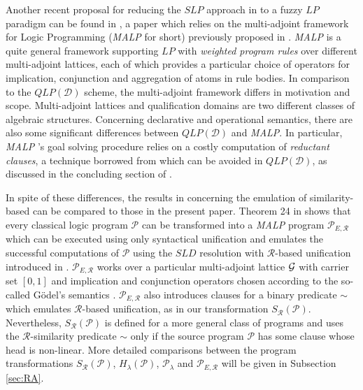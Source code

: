 \documentclass{sigplanconf}
\newcommand{\qdom}{\mathcal{D}} \newcommand{\dqdom}{D \setminus \{\bot\}} \newcommand{\bqdom}{(D \setminus \{\bot\}) \uplus \{?\}}
\newcommand{\simrel}{\mathcal{R}}
\newcommand{\qlp}[1]{QLP({#1})} \newcommand{\slp}[2]{SLP({#1,#2})} \newcommand{\sqlp}[2]{SQLP({#1,#2})} \newcommand{\bqlp}[1]{BQLP({#1})} \newcommand{\clp}[1]{CLP({#1})}
\newcommand{\trans}[2]{S_{#1}(#2)}
\newcommand{\extended}[2]{H_{#1}(#2)} \newcommand{\abstracted}[2]{{#1}_{#2}}
\newcommand{\MAProg}{\mathcal{P}_{E, \simrel}}
\newcommand{\Prog}{\mathcal{P}} \newcommand{\UProg}{\mathcal{P_U}}
\newcommand{\MALP}{{\em MALP }}
\newcommand{\malp}{{\em MALP}}
\theoremstyle{definition}
\theoremstyle{plain}
\begin{document}
Another recent proposal for reducing the $SLP$ approach in \cite{Ses02} to a fuzzy $LP$ paradigm can be found in \cite{MOV04}, a  paper which relies on  the multi-adjoint framework for Logic Programming ({\MALP} for short) previously proposed in \cite{MOV01a,MOV01b}. {\MALP} is a quite general framework supporting $LP$ with {\em weighted program rules} over different multi-adjoint lattices, each of which provides a particular choice of operators for implication, conjunction  and aggregation of atoms in rule bodies. In comparison to the $\qlp{\qdom}$ scheme, the multi-adjoint framework differs in motivation and scope. Multi-adjoint lattices and qualification domains are  two different classes of algebraic structures. Concerning declarative and
operational semantics, there are also some significant differences between $\qlp{\qdom}$ and \malp. In particular, \MALP's goal solving procedure relies on a costly computation of {\em reductant clauses}, a technique borrowed from \cite{KS92} which can be avoided in $\qlp{\qdom}$, as discussed in the concluding section of \cite{RR08}.

In spite of these differences, the results in \cite{MOV04} concerning the emulation of similarity-based  can be compared to those in the present paper. Theorem 24 in \cite{MOV04} shows that  every classical logic  program $\Prog$ can be transformed into a \MALP program $\MAProg$ which can be executed using only syntactical unification and emulates the successful computations of $\Prog$ using the $SLD$ resolution with $\simrel$-based unification
introduced  in \cite{Ses02}. $\MAProg$ works over a particular multi-adjoint lattice $\mathcal{G}$ with carrier set $[0,1]$ and implication and conjunction operators chosen according to the so-called G\"{o}del's semantics \cite{Voj01}. $\MAProg$ also introduces clauses for a binary predicate $\sim$ which emulates $\simrel$-based unification, as in our transformation $\trans{\simrel}{\Prog}$. Nevertheless, $\trans{\simrel}{\Prog}$   is defined for a more general class of programs and uses the $\simrel$-similarity predicate $\sim$ only if the source program $\Prog$ has some clause whose head is non-linear. More detailed comparisons between the program transformations $\trans{\simrel}{\Prog}$,  $\extended{\lambda}{\Prog}$, $\abstracted{\Prog}{\lambda}$ and $\MAProg$ will be given in Subsection \ref{sec:RA}.
\end{document}
